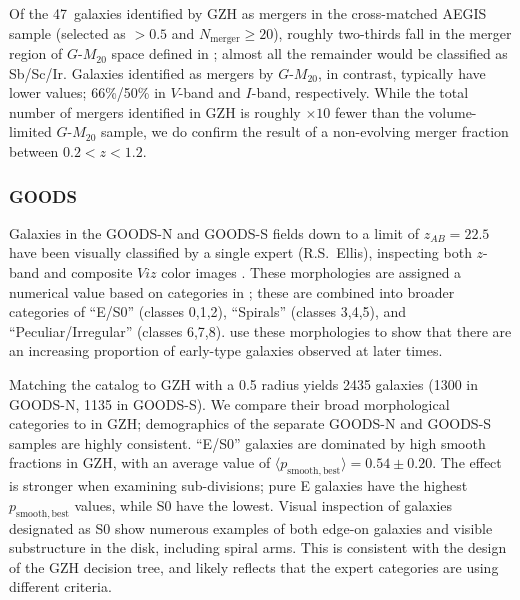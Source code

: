 \documentclass[twocolumn]{aastex6}
\begin{document}
Of the 47~galaxies identified by GZH as mergers in the cross-matched AEGIS sample (selected as \pmerger$>0.5$ and $N_\mathrm{merger}\ge20$), roughly two-thirds fall in the merger region of $G$-$M_{20}$ space defined in \citet{lot08}; almost all the remainder would be classified as Sb/Sc/Ir. Galaxies identified as mergers by $G$-$M_{20}$, in contrast, typically have lower \pmerger{} values; 66\%/50\% in $V$-band and $I$-band, respectively. While the total number of mergers identified in GZH is roughly $\times10$ fewer than the volume-limited $G$-$M_{20}$ sample, we do confirm the result of a non-evolving merger fraction between $0.2<z<1.2$. %

\subsubsection{GOODS}

Galaxies in the GOODS-N and GOODS-S fields down to a limit of $z_{AB}=22.5$ have been visually classified by a single expert (R.S.~Ellis), inspecting both $z$-band and composite $Viz$ color images \citep{bun05}. These morphologies are assigned a numerical value based on categories in \citet{bri98a}; these are combined into broader categories of ``E/S0'' (classes 0,1,2), ``Spirals'' (classes 3,4,5), and ``Peculiar/Irregular'' (classes 6,7,8). \citet{bun05} use these morphologies to show that there are an increasing proportion of early-type galaxies observed at later times. 

Matching the \citet{bun05} catalog to GZH with a 0.5\arcsec{} radius yields 2435 galaxies (1300 in GOODS-N, 1135 in GOODS-S). We compare their broad morphological categories to \pbest{} in GZH; demographics of the separate GOODS-N and GOODS-S samples are highly consistent. ``E/S0'' galaxies are dominated by high smooth fractions in GZH, with an average value of $\langle p_\mathrm{smooth,best}\rangle=0.54\pm0.20$. The effect is stronger when examining sub-divisions; pure E galaxies have the highest $p_\mathrm{smooth,best}$ values, while S0 have the lowest. Visual inspection of galaxies designated as S0 show numerous examples of both edge-on galaxies and visible substructure in the disk, including spiral arms. This is consistent with the design of the GZH decision tree, and likely reflects that the expert categories are using different criteria. 
\end{document}
